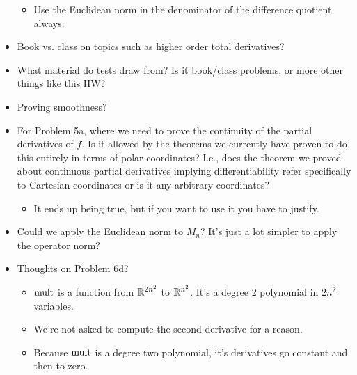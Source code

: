 \documentclass[../notes.tex]{subfiles}
\begin{document}
\begin{itemize}
\begin{itemize}
        \item Use the Euclidean norm in the denominator of the difference quotient always.
    \end{itemize}
    \item Book vs. class on topics such as higher order total derivatives?
    \item What material do tests draw from? Is it book/class problems, or more other things like this HW?
    \item Proving smoothness?
    \item For Problem 5a, where we need to prove the continuity of the partial derivatives of $f$. Is it allowed by the theorems we currently have proven to do this entirely in terms of polar coordinates? I.e., does the theorem we proved about continuous partial derivatives implying differentiability refer specifically to Cartesian coordinates or is it any arbitrary coordinates?
    \begin{itemize}
        \item It ends up being true, but if you want to use it you have to justify.
    \end{itemize}
    \item Could we apply the Euclidean norm to $M_n$? It's just a lot simpler to apply the operator norm?
    \item Thoughts on Problem 6d?
    \begin{itemize}
        \item $\operatorname{mult}$ is a function from $\mathbb{R}^{2n^2}$ to $\mathbb{R}^{n^2}$. It's a degree 2 polynomial in $2n^2$ variables.
        \item We're not asked to compute the second derivative for a reason.
        \item Because $\operatorname{mult}$ is a degree two polynomial, it's derivatives go constant and then to zero.
    \end{itemize}
\end{itemize}
\end{document}
